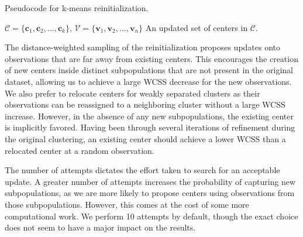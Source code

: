 \documentclass{article}
\begin{document}
\begin{algorithm}
\caption{Pseudocode for k-means reinitialization.}
\begin{algorithmic} 
\REQUIRE $\mathcal{C} = \{\mathbf{c}_1, \mathbf{c}_2, \ldots, \mathbf{c}_k \}$, $\mathcal{V} = \{\mathbf{v}_1, \mathbf{v}_2, \ldots, \mathbf{v}_n \}$
\ENSURE An updated set of centers in $\mathcal{C}$.
\ENDFOR
\end{algorithmic}
\label{algo:main}
\end{algorithm}

The distance-weighted sampling of the reinitialization proposes updates onto observations that are far away from existing centers.
This encourages the creation of new centers inside distinct subpopulations that are not present in the original dataset, allowing us to achieve a large WCSS decrease for the new observations.
We also prefer to relocate centers for weakly separated clusters as their observations can be reassigned to a neighboring cluster without a large WCSS increase.
However, in the absence of any new subpopulations, the existing center is implicitly favored.
Having been through several iterations of refinement during the original clustering, an existing center should achieve a lower WCSS than a relocated center at a random observation.

The number of attempts dictates the effort taken to search for an acceptable update.
A greater number of attempts increases the probability of capturing new subpopulations, as we are more likely to propose centers using observations from those subpopulations.
However, this comes at the cost of some more computational work.
We perform 10 attempts by default, though the exact choice does not seem to have a major impact on the results.
\end{document}
